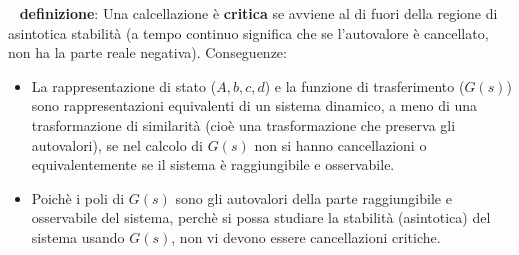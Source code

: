 \ \newline
\textbf{definizione}:  Una calcellazione è \textbf{critica} se avviene al di fuori della regione di asintotica stabilità (a tempo continuo significa che se l'autovalore è cancellato, non ha la parte reale negativa).
\newline
\newline
Conseguenze:
\begin{itemize}
    \item La rappresentazione di stato ($A,b,c,d$) e la funzione di trasferimento ($G(s)$) sono rappresentazioni equivalenti di un sistema dinamico, a meno di una trasformazione di similarità (cioè una trasformazione che preserva gli autovalori), se nel calcolo di $G(s)$ non si hanno cancellazioni o equivalentemente se il sistema è raggiungibile e osservabile.
    \item Poichè i poli di $G(s)$ sono gli autovalori della parte raggiungibile e osservabile del sistema, perchè si possa studiare la stabilità (asintotica) del sistema usando $G(s)$, non vi devono essere cancellazioni critiche.
\end{itemize}
\newpage
